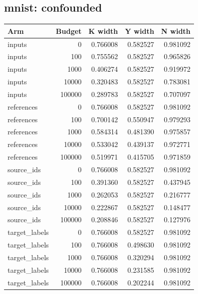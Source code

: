 \reservetable
\subsection{mnist: confounded}

\begingroup\small
\setlength{\tabcolsep}{4pt}
\begin{longtable}{lrrrr}
\toprule

Arm & Budget & K width & Y width & N width\\\midrule\endhead

inputs & 0 & 0.766008 & 0.582527 & 0.981092\\

inputs & 100 & 0.755562 & 0.582527 & 0.965826\\

inputs & 1000 & 0.406274 & 0.582527 & 0.919972\\

inputs & 10000 & 0.320483 & 0.582527 & 0.783081\\

inputs & 100000 & 0.289783 & 0.582527 & 0.707097\\

references & 0 & 0.766008 & 0.582527 & 0.981092\\

references & 100 & 0.700142 & 0.550947 & 0.979293\\

references & 1000 & 0.584314 & 0.481390 & 0.975857\\

references & 10000 & 0.533042 & 0.439137 & 0.972771\\

references & 100000 & 0.519971 & 0.415705 & 0.971859\\

source\_ids & 0 & 0.766008 & 0.582527 & 0.981092\\

source\_ids & 100 & 0.391360 & 0.582527 & 0.437945\\

source\_ids & 1000 & 0.262053 & 0.582527 & 0.216777\\

source\_ids & 10000 & 0.222867 & 0.582527 & 0.148477\\

source\_ids & 100000 & 0.208846 & 0.582527 & 0.127976\\

target\_labels & 0 & 0.766008 & 0.582527 & 0.981092\\

target\_labels & 100 & 0.766008 & 0.498630 & 0.981092\\

target\_labels & 1000 & 0.766008 & 0.320294 & 0.981092\\

target\_labels & 10000 & 0.766008 & 0.231585 & 0.981092\\

target\_labels & 100000 & 0.766008 & 0.202244 & 0.981092\\

\bottomrule
\end{longtable}
\endgroup

